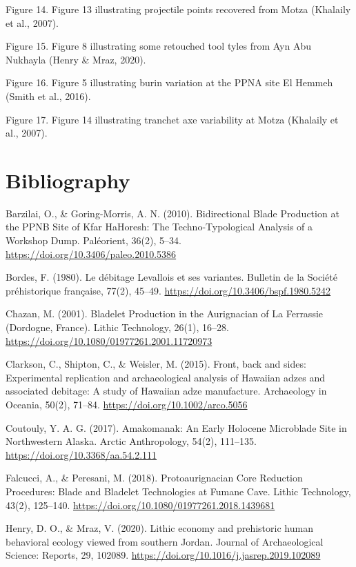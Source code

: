 \documentclass[
]{article}
\begin{document}
Figure 14. Figure 13 illustrating projectile points recovered from Motza
(Khalaily et al., 2007).

Figure 15. Figure 8 illustrating some retouched tool tyles from Ayn Abu
Nukhayla (Henry \& Mraz, 2020).

Figure 16. Figure 5 illustrating burin variation at the PPNA site El
Hemmeh (Smith et al., 2016).

Figure 17. Figure 14 illustrating tranchet axe variability at Motza
(Khalaily et al., 2007).

\hypertarget{bibliography}{%
\section{Bibliography}\label{bibliography}}

Barzilai, O., \& Goring-Morris, A. N. (2010). Bidirectional Blade
Production at the PPNB Site of Kfar HaHoresh: The Techno-Typological
Analysis of a Workshop Dump. Paléorient, 36(2), 5--34.
\url{https://doi.org/10.3406/paleo.2010.5386}

Bordes, F. (1980). Le débitage Levallois et ses variantes. Bulletin de
la Société préhistorique française, 77(2), 45--49.
\url{https://doi.org/10.3406/bspf.1980.5242}

Chazan, M. (2001). Bladelet Production in the Aurignacian of La
Ferrassie (Dordogne, France). Lithic Technology, 26(1), 16--28.
\url{https://doi.org/10.1080/01977261.2001.11720973}

Clarkson, C., Shipton, C., \& Weisler, M. (2015). Front, back and sides:
Experimental replication and archaeological analysis of Hawaiian adzes
and associated debitage: A study of Hawaiian adze manufacture.
Archaeology in Oceania, 50(2), 71--84.
\url{https://doi.org/10.1002/arco.5056}

Coutouly, Y. A. G. (2017). Amakomanak: An Early Holocene Microblade Site
in Northwestern Alaska. Arctic Anthropology, 54(2), 111--135.
\url{https://doi.org/10.3368/aa.54.2.111}

Falcucci, A., \& Peresani, M. (2018). Protoaurignacian Core Reduction
Procedures: Blade and Bladelet Technologies at Fumane Cave. Lithic
Technology, 43(2), 125--140.
\url{https://doi.org/10.1080/01977261.2018.1439681}

Henry, D. O., \& Mraz, V. (2020). Lithic economy and prehistoric human
behavioral ecology viewed from southern Jordan. Journal of
Archaeological Science: Reports, 29, 102089.
\url{https://doi.org/10.1016/j.jasrep.2019.102089}
\end{document}
